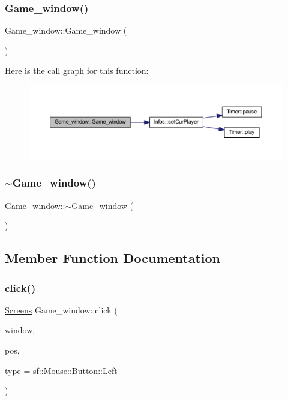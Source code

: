 \subsubsection{\texorpdfstring{Game\+\_\+window()}{Game\_window()}}
{\footnotesize\ttfamily Game\+\_\+window\+::\+Game\+\_\+window (\begin{DoxyParamCaption}{ }\end{DoxyParamCaption})}

Here is the call graph for this function\+:\nopagebreak
\begin{figure}[H]
\begin{center}
\leavevmode
\includegraphics[width=350pt]{class_game__window_a1d0ac99e8c117a5016883b52446c6530_cgraph}
\end{center}
\end{figure}
\mbox{\label{class_game__window_a5e84f0f55c4526bb0ea3a592c439c16f}} 
\subsubsection{\texorpdfstring{$\sim$\+Game\+\_\+window()}{~Game\_window()}}
{\footnotesize\ttfamily Game\+\_\+window\+::$\sim$\+Game\+\_\+window (\begin{DoxyParamCaption}{ }\end{DoxyParamCaption})}



\subsection{Member Function Documentation}
\mbox{\label{class_game__window_afa942088809bf10731bb31d0d37b878d}} 
\subsubsection{\texorpdfstring{click()}{click()}}
{\footnotesize\ttfamily \hyperlink{_globals_8h_a3d5776bab98402b03be09156bacf4f68}{Screens} Game\+\_\+window\+::click (\begin{DoxyParamCaption}\item[{const sf\+::\+Render\+Window \&}]{window,  }\item[{sf\+::\+Vector2i}]{pos,  }\item[{const sf\+::\+Mouse\+::\+Button \&}]{type = {\ttfamily sf\+:\+:Mouse\+:\+:Button\+:\+:Left} }\end{DoxyParamCaption})}

